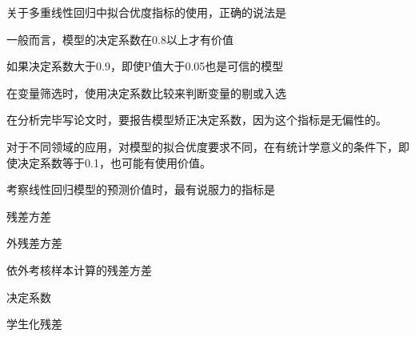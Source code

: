 \par\addvspace{6pt}\noindent\begin{minipage}{\linewidth}


关于多重线性回归中拟合优度指标的使用，正确的说法是


\begin{choices}

\item 一般而言，模型的决定系数在0.8以上才有价值

\item 如果决定系数大于0.9，即使P值大于0.05也是可信的模型

\item 在变量筛选时，使用决定系数比较来判断变量的剔或入选

\item 在分析完毕写论文时，要报告模型矫正决定系数，因为这个指标是无偏性的。

\item 对于不同领域的应用，对模型的拟合优度要求不同，在有统计学意义的条件下，即使决定系数等于0.1，也可能有使用价值。

\end{choices}

\end{minipage}\par\vspace{4pt}

\par\addvspace{6pt}\noindent\begin{minipage}{\linewidth}


考察线性回归模型的预测价值时，最有说服力的指标是


\begin{choices}

\item 残差方差

\item 外残差方差

\item 依外考核样本计算的残差方差

\item 决定系数

\item 学生化残差

\end{choices}

\end{minipage}\par\vspace{4pt}

